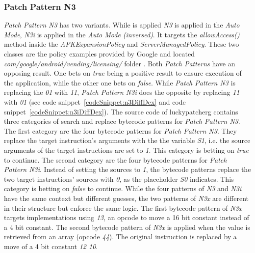 \subsubsection{Patch Pattern N3}
\textit{Patch Pattern N3} has two variants. While is applied \textit{N3} is applied in the \textit{Auto Mode}, \textit{N3i} is applied in the \textit{Auto Mode (inversed)}.
It targets the \textit{allowAccess()} method inside the \textit{APKExpansionPolicy} and \textit{ServerManagedPolicy}.
These two classes are the policy examples provided by Google and located \textit{com/google/android/vending/licensing/} folder \cite{developersLicensingReference}.
\newline
Both \textit{Patch Patterns} have an opposing result.
One bets on \textit{true} being a positive result to ensure execution of the application, while the other one bets on \textit{false}.
While \textit{Patch Pattern N3} is replacing the \textit{01} with \textit{11}, \textit{Patch Pattern N3i} does the opposite by replacing \textit{11} with \textit{01} (see code snippet~\ref{codeSnippet:n3DiffDex} and code snippet~\ref{codeSnippet:n3iDiffDex}).
\newline
The source code of \gls{luckypatcherg} contains three categories of search and replace bytecode patterns for \textit{Patch Pattern N3}.
The first category are the four bytecode patterns for \textit{Patch Pattern N3}.
They replace the target instruction's arguments with the the variable \textit{S1}, i.e. the source arguments of the target instructions are set to \textit{1}.
This category is betting on \textit{true} to continue.
\newline
The second category are the four bytecode patterns for \textit{Patch Pattern N3i}.
Instead of setting the sources to \textit{1}, the bytecode patterns replace the two target instructions' sources with \textit{0}, as the placeholder \textit{S0} indicates.
This category is betting on \textit{false} to continue.
\newline
While the four patterns of \textit{N3} and \textit{N3i} have the same context but different guesses, the two patterns of \textit{N3x} are different in their structure but enforce the same logic.
The first bytecode pattern of \textit{N3x} targets implementations using \textit{13}, an opcode to move a 16 bit constant instead of a 4 bit constant.
The second bytecode pattern of \textit{N3x} is applied when the value is retrieved from an array (opcode \textit{44}).
The original instruction is replaced by a move of a 4 bit constant \textit{12 10}.
\newline
